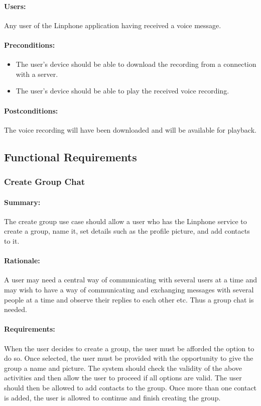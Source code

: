 \documentclass[11pt]{article}
\begin{document}
\paragraph{Users:} Any user of the Linphone application having received a voice message.
\paragraph{Preconditions:} 
\begin{itemize}
\item The user's device should be able to download the recording from a connection with a server.
\item The user's device should be able to play the received voice recording.
\end{itemize}
\paragraph{{Postconditions:}} The voice recording will have been downloaded and will be available for playback.

\subsection{Functional Requirements}
\subsubsection{Create Group Chat} \label{FR-create-group}
\paragraph{Summary:} The create group use case should allow a user who has the Linphone service to create a group, name it, set details such as the profile picture, and add contacts to it.
\paragraph{Rationale:} A user may need a central way of communicating with several users at a time and may wish to have a way of communicating and exchanging messages with several people at a time and observe their replies to each other etc. Thus a group chat is needed.
\paragraph{Requirements:} When the user decides to create a group, the user must be afforded the option to do so. Once selected, the user must be provided with the opportunity to give the group a name and picture. The system should check the validity of the above activities and then allow the user to proceed if all options are valid. The user should then be allowed to add contacts to the group. Once more than one contact is added, the user is allowed to continue and finish creating the group.
\end{document}
